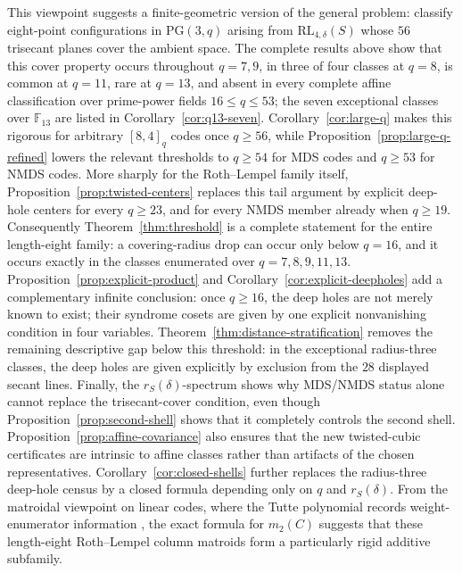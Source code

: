 \documentclass[11pt]{article}
\newcommand{\F}{\mathbb F}
\newcommand{\PG}{\mathrm{PG}}
\newcommand{\RL}{\mathrm{RL}}
\theoremstyle{plain}
\theoremstyle{definition}
\begin{document}
This viewpoint suggests a finite-geometric version of the general problem:
classify eight-point configurations in \(\PG(3,q)\) arising from
\(\RL_{4,\delta}(S)\) whose \(56\) trisecant planes cover the ambient space.
The complete results above show that this cover property occurs throughout
\(q=7,9\), in three of four classes at \(q=8\), is common at \(q=11\), rare
at \(q=13\), and absent in every complete affine classification over
prime-power fields \(16\le q\le53\); the seven exceptional classes over
\(\F_{13}\) are listed in Corollary~\ref{cor:q13-seven}.
Corollary~\ref{cor:large-q} makes this rigorous for arbitrary \([8,4]_q\)
codes once \(q\ge56\), while Proposition~\ref{prop:large-q-refined} lowers
the relevant thresholds to \(q\ge54\) for MDS codes and \(q\ge53\) for NMDS
codes.  More sharply for the Roth--Lempel family itself,
Proposition~\ref{prop:twisted-centers} replaces this tail argument by
explicit deep-hole centers for every \(q\ge23\), and for every NMDS member
already when \(q\ge19\).  Consequently
Theorem~\ref{thm:threshold} is a complete statement for the entire
length-eight family: a covering-radius drop can occur only below \(q=16\),
and it occurs exactly in the classes enumerated over \(q=7,8,9,11,13\).
Proposition~\ref{prop:explicit-product} and
Corollary~\ref{cor:explicit-deepholes} add a complementary infinite
conclusion: once \(q\ge16\), the deep holes are not merely known to exist;
their syndrome cosets are given by one explicit nonvanishing condition in
four variables.
Theorem~\ref{thm:distance-stratification} removes the remaining descriptive
gap below this threshold: in the exceptional radius-three classes, the deep
holes are given explicitly by exclusion from the \(28\) displayed secant
lines.  Finally, the \(r_S(\delta)\)-spectrum shows why MDS/NMDS status alone
cannot replace the trisecant-cover condition, even though
Proposition~\ref{prop:second-shell} shows that it completely controls the
second shell.  Proposition~\ref{prop:affine-covariance} also ensures that
the new twisted-cubic certificates are intrinsic to affine classes rather
than artifacts of the chosen representatives.
Corollary~\ref{cor:closed-shells} further replaces the radius-three
deep-hole census by a closed formula depending only on \(q\) and
\(r_S(\delta)\).
From the matroidal viewpoint on linear codes, where the Tutte polynomial
records weight-enumerator information \cite{Greene1976}, the exact formula
for \(m_2(C)\) suggests that these length-eight Roth--Lempel column matroids
form a particularly rigid additive subfamily.
\end{document}
